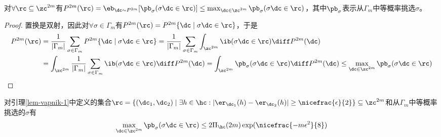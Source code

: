 \documentclass{ctexart}
\begin{document}
\begin{lemma} \label{lem-vapnik-2}
    对$\forall \rc \subseteq \zc^{2m}$有$P^{2m} (\rc) = \eb_{\dc \sim P^{2m}} [\pb_\sigma (\sigma \dc \in \rc)] \le \max_{\dc \in \zc^{2m}} \pb_\sigma (\sigma \dc \in \rc)$，其中$\pb_\sigma$表示从$\Gamma_m$中等概率挑选$\sigma$。
\end{lemma}

\begin{proof}
    置换是双射，因此对$\forall \sigma \in \Gamma_m$有$P^{2m} (\rc) = P^{2m} \{ \dc \mid \sigma \dc \in \rc \}$，于是
    \begin{align*}
        P^{2m} (\rc)
         & = \frac{1}{|\Gamma_m|} \sum_{\sigma \in \Gamma_m} P^{2m} \{ \dc \mid \sigma \dc \in \rc \} = \frac{1}{|\Gamma_m|} \sum_{\sigma \in \Gamma_m} \int_{\zc^{2m}} \ib(\sigma \dc \in \rc) \diff P^{2m} (\dc)                                                   \\
         & = \int_{\zc^{2m}} \frac{1}{|\Gamma_m|} \sum_{\sigma \in \Gamma_m} \ib(\sigma \dc \in \rc) \diff P^{2m} (\dc) = \int_{\zc^{2m}} \pb_\sigma (\sigma \dc \in \rc) \diff P^{2m} (\dc) \le \max_{\dc \in \zc^{2m}} \pb_\sigma (\sigma \dc \in \rc)
    \end{align*}
\end{proof}

\begin{lemma} \label{lem-vapnik-3}
    对引理\ref{lem-vapnik-1}中定义的集合$\rc = \{ (\dc_1, \dc_2) \mid \exists h \in \hc: |\er_{\dc_1} (h) - \er_{\dc_2} (h)| \ge \nicefrac{\epsilon}{2} \}  \subseteq \zc^{2m}$和从$\Gamma_m$中等概率挑选的$\sigma$有
    \begin{align*}
        \max_{\dc \in \zc^{2m}} \pb_\sigma (\sigma \dc \in \rc) \le 2 \Pi_\hc (2m) \exp ( \nicefrac{-m \epsilon^2}{8} )
    \end{align*}
\end{lemma}
\end{document}

